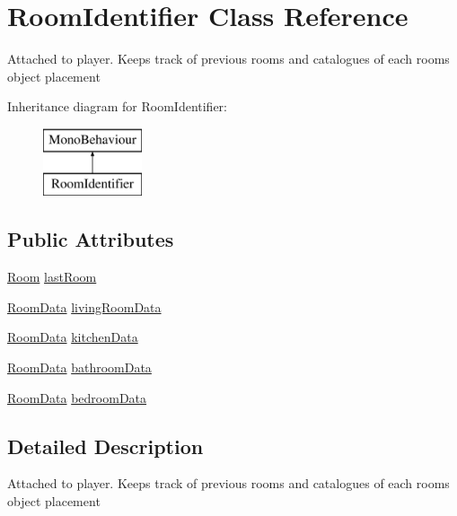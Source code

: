 \hypertarget{class_room_identifier}{}\section{Room\+Identifier Class Reference}
\label{class_room_identifier}


Attached to player. Keeps track of previous rooms and catalogues of each room\textquotesingle{}s object placement  


Inheritance diagram for Room\+Identifier\+:\begin{figure}[H]
\begin{center}
\leavevmode
\includegraphics[height=2.000000cm]{class_room_identifier}
\end{center}
\end{figure}
\subsection*{Public Attributes}
\begin{DoxyCompactItemize}
\item 
\hyperlink{_load_room_8cs_a487e93cb0c81b7ae3c65d743fde387c0}{Room} \hyperlink{class_room_identifier_aec14279ec6be131c0d072f6cb6fdf300}{last\+Room}
\item 
\hyperlink{class_room_data}{Room\+Data} \hyperlink{class_room_identifier_a8e148cd67699b89e8eafbb9abfd58734}{living\+Room\+Data}
\item 
\hyperlink{class_room_data}{Room\+Data} \hyperlink{class_room_identifier_ac7ad3b5c62fd707a0f03ed6dd8ecd09b}{kitchen\+Data}
\item 
\hyperlink{class_room_data}{Room\+Data} \hyperlink{class_room_identifier_ab1e6fcb5525e0a801abbac9171271f29}{bathroom\+Data}
\item 
\hyperlink{class_room_data}{Room\+Data} \hyperlink{class_room_identifier_abba047f11e8bb59b367b1ea160787bf8}{bedroom\+Data}
\end{DoxyCompactItemize}


\subsection{Detailed Description}
Attached to player. Keeps track of previous rooms and catalogues of each room\textquotesingle{}s object placement 



